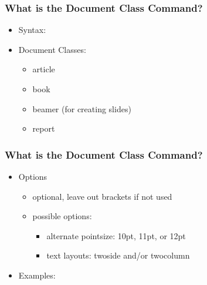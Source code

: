 \documentclass[17pt]{beamer}
\begin{document}
	\begin{frame}
		\frametitle{What is the Document Class Command?}
		
		\begin{itemize}
			
			\item Syntax: \begin{minipage}[m]{0.6\textwidth}
				
			\end{minipage}
			\item \pause Document Classes:
				\begin{itemize}
					\item \pause article
					\item \pause book
					\item \pause beamer (for creating slides)
					\item \pause report
				\end{itemize}
		\end{itemize}
		
	\end{frame}	

	\begin{frame}
		\frametitle{What is the Document Class Command?}
		
		\begin{itemize}
			\item Options
				\begin{itemize}
					\item \pause optional, leave out brackets if not used
					\item \pause possible options:
						\begin{itemize}
							\item \pause alternate pointsize: 10pt, 11pt, or 12pt
							\item \pause text layouts: twoside and/or twocolumn
						\end{itemize}
				\end{itemize}
			\item\pause Examples: 
		\end{itemize}
		
	\end{frame}	
\end{document}
